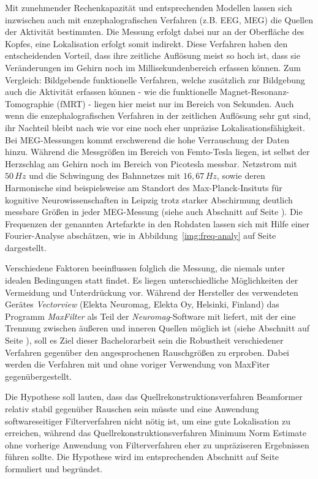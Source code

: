 \documentclass[doc,a4paper,12pt]{apa6}
\makeatletter
\DeclareRobustCommand*{\nameref}[1]{%
      \glqq{\myorg@nameref{#1}}\grqq%
    }%
\makeatother
\begin{document}
Mit zunehmender Rechenkapazität und entsprechenden Modellen lassen sich inzwischen auch mit enzephalografischen Verfahren (z.B. EEG, MEG) die Quellen der Aktivität bestimmten. Die Messung erfolgt dabei nur an der Oberfläche des Kopfes, eine Lokalisation erfolgt somit indirekt. Diese Verfahren haben den entscheidenden Vorteil, dass ihre zeitliche Auflösung meist so hoch ist, dass sie Veränderungen im Gehirn noch im Millisekundenbereich erfassen können. Zum Vergleich: Bildgebende funktionelle Verfahren, welche zusätzlich zur Bildgebung auch die Aktivität erfassen können - wie die funktionelle Magnet-Resonanz-Tomographie (fMRT) - liegen hier meist nur im Bereich von Sekunden. Auch wenn die enzephalografischen Verfahren in der zeitlichen Auflösung sehr gut sind, ihr Nachteil bleibt nach wie vor eine noch eher unpräzise Lokalisationsfähigkeit. Bei MEG-Messungen kommt erschwerend die hohe Verrauschung der Daten hinzu. Während die Messgrößen im Bereich von Femto-Tesla liegen, ist selbst der Herzschlag am Gehirn noch im Bereich von Picotesla messbar. Netzstrom mit $50\,Hz$ und die Schwingung des Bahnnetzes mit $16,67\,Hz$, sowie deren Harmonische sind beispielsweise am Standort des Max-Planck-Insituts für kognitive Neurowissenschaften in Leipzig trotz starker Abschirmung deutlich messbare Größen in jeder MEG-Messung (siehe auch Abschnitt \nameref{sec:rauschen} auf Seite \pageref{sec:rauschen}). Die Frequenzen der genannten Artefarkte in den Rohdaten lassen sich mit Hilfe einer Fourier-Analyse abschätzen, wie in Abbildung~\ref{img:freq-analy} auf Seite~\pageref{img:freq-analy} dargestellt.

Verschiedene Faktoren beeinflussen folglich die Messung, die niemals unter idealen Bedingungen statt findet. Es liegen unterschiedliche Möglichkeiten der Vermeidung und Unterdrückung vor. Während der Hersteller des verwendeten Gerätes \emph{Vectorview} (Elekta Neuromag, Elekta Oy, Helsinki, Finland) das Programm \emph{MaxFilter} als Teil der \emph{Neuromag}-Software mit liefert, mit der eine Trennung zwischen äußeren und inneren Quellen möglich ist (siehe Abschnitt \nameref{sec:maxfilter} auf Seite \pageref{sec:maxfilter}), soll es Ziel dieser Bachelorarbeit sein die Robustheit verschiedener Verfahren gegenüber den angesprochenen Rauschgrößen zu erproben. Dabei werden die Verfahren mit und ohne voriger Verwendung von MaxFiter gegenübergestellt.

Die Hypothese soll lauten, dass das Quellrekonstruktionsverfahren Beamformer relativ stabil gegenüber Rauschen sein müsste und eine Anwendung softwareseitiger Filterverfahren nicht nötig ist, um eine gute Lokalisation zu erreichen, während das Quellrekonstruktionsverfahren Minimum Norm Estimate ohne vorherige Anwendung von Filterverfahren eher zu unpräziseren Ergebnissen führen sollte. Die Hypothese wird im entsprechenden Abschnitt auf Seite \pageref{sec:hypo} formuliert und begründet.
\end{document}
